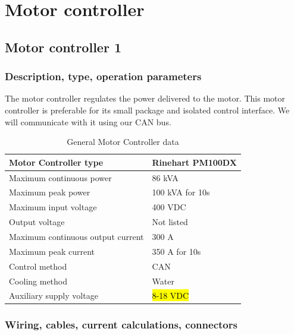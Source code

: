 \documentclass{article}
\begin{document}
\section{Motor controller}\label{motor_controller}
\subsection{Motor controller 1}\label{motor_controller_1}
\subsubsection{Description, type, operation parameters}

The motor controller regulates the power delivered to the motor. This motor controller is preferable for its small package and isolated control interface. We will communicate with it using our CAN bus. 

\begin{table}[H]
	\centering
	\begin{tabular}{|l|l|}
	\hline
	Motor Controller type & Rinehart PM100DX \\ \hline
	Maximum continuous power & 86 kVA \\ \hline
	Maximum peak power & 100 kVA for 10s \\ \hline
	Maximum input voltage & 400 VDC \\ \hline
	Output voltage & Not listed \\ \hline
	Maximum continuous output current & 300 A \\ \hline
	Maximum peak current & 350 A for 10s \\ \hline
	Control method & CAN \\ \hline
	Cooling method & Water \\ \hline   
	Auxiliary supply voltage & \hl{8-18 VDC} \\ \hline
	\end{tabular}
	\caption{General Motor Controller data}
	\label{MC}
\end{table}

\subsubsection{Wiring, cables, current calculations, connectors}
\end{document}
